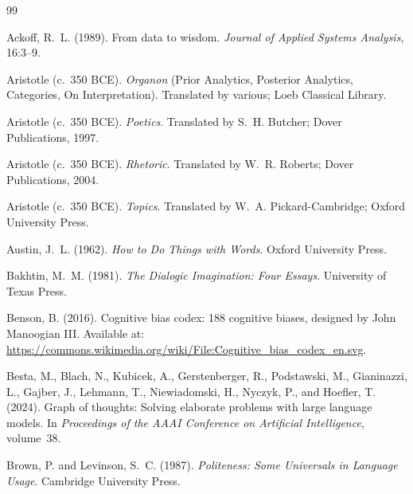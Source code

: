 \documentclass[11pt,a4paper]{article}
\begin{document}
\begin{thebibliography}{99}

Ackoff, R.~L. (1989).
\newblock From data to wisdom.
\newblock \emph{Journal of Applied Systems Analysis}, 16:3--9.

Aristotle (c.~350 BCE{}).
\newblock \emph{Organon} (Prior Analytics, Posterior Analytics, Categories, On Interpretation).
\newblock Translated by various; Loeb Classical Library.

Aristotle (c.~350 BCE{}).
\newblock \emph{Poetics}.
\newblock Translated by S.~H. Butcher; Dover Publications, 1997.

Aristotle (c.~350 BCE{}).
\newblock \emph{Rhetoric}.
\newblock Translated by W.~R. Roberts; Dover Publications, 2004.

Aristotle (c.~350 BCE{}).
\newblock \emph{Topics}.
\newblock Translated by W.~A. Pickard-Cambridge; Oxford University Press.

Austin, J.~L. (1962).
\newblock \emph{How to Do Things with Words}.
\newblock Oxford University Press.

Bakhtin, M.~M. (1981).
\newblock \emph{The Dialogic Imagination: Four Essays}.
\newblock University of Texas Press.

Benson, B. (2016).
\newblock Cognitive bias codex: 188 cognitive biases, designed by {J}ohn {M}anoogian {III}.
\newblock Available at: \url{https://commons.wikimedia.org/wiki/File:Cognitive_bias_codex_en.svg}.

Besta, M., Blach, N., Kubicek, A., Gerstenberger, R., Podstawski, M., Gianinazzi, L., Gajber, J., Lehmann, T., Niewiadomski, H., Nyczyk, P., and Hoefler, T. (2024).
\newblock Graph of thoughts: Solving elaborate problems with large language models.
\newblock In \emph{Proceedings of the AAAI Conference on Artificial Intelligence}, volume~38.

Brown, P. and Levinson, S.~C. (1987).
\newblock \emph{Politeness: Some Universals in Language Usage}.
\newblock Cambridge University Press.


\end{thebibliography}
\end{document}

